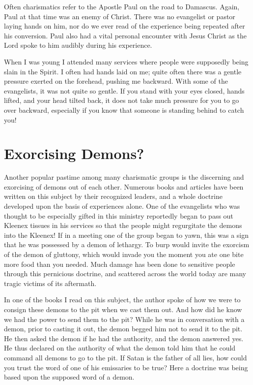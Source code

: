 Often charismatics refer to the Apostle Paul on the road to Damascus. Again, Paul at that time was an enemy of Christ. There was no evangelist or pastor laying hands on him, nor do we ever read of the experience being repeated after his conversion. Paul also had a vital personal encounter with Jesus Christ as the Lord spoke to him audibly during his experience. 

When I was young I attended many services where people were supposedly being slain in the Spirit. I often had hands laid on me; quite often there was a gentle pressure exerted on the forehead, pushing me backward. With some of the evangelists, it was not quite so gentle. If you stand with your eyes closed, hands lifted, and your head tilted back, it does not take much pressure for you to go over backward, especially if you know that someone is standing behind to catch you! 

\section*{Exorcising Demons?}

Another popular pastime among many charismatic groups is the discerning and exorcising of demons out of each other. Numerous books and articles have been written on this subject by their recognized leaders, and a whole doctrine developed upon the basis of experiences alone. One of the evangelists who was thought to be especially gifted in this ministry reportedly began to pass out Kleenex tissues in his services so that the people might regurgitate the demons into the Kleenex! If in a meeting one of the group began to yawn, this was a sign that he was possessed by a demon of lethargy. To burp would invite the exorcism of the demon of gluttony, which would invade you the moment you ate one bite more food than you needed. Much damage has been done to sensitive people through this pernicious doctrine, and scattered across the world today are many tragic victims of its aftermath. 

In one of the books I read on this subject, the author spoke of how we were to consign these demons to the pit when we cast them out. And how did he know we had the power to send them to the pit? While he was in conversation with a demon, prior to casting it out, the demon begged him not to send it to the pit. He then asked the demon if he had the authority, and the demon answered yes. He thus declared on the authority of what the demon told him that he could command all demons to go to the pit. If Satan is the father of all lies, how could you trust the word of one of his emissaries to be true? Here a doctrine was being based upon the supposed word of a demon. 

